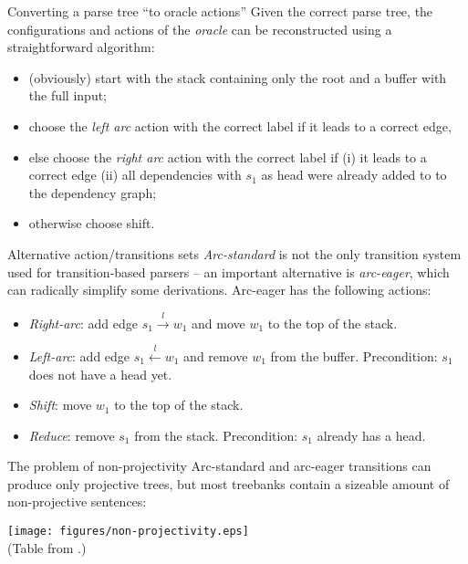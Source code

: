 \documentclass[style=upen, size=14pt]{powerdot}
\newcommand{\gold}{\color{arany}}
\theoremstyle{definition}
\begin{document}
\begin{slide}[toc=Oracle actions]{Converting a parse tree ``to oracle actions''}
  Given the correct parse tree, the configurations and actions of the
  \emph{oracle} can be reconstructed using a straightforward algorithm:
  \begin{itemize}
  \item (obviously) start with the stack containing only the root and a buffer
    with the full input;
  \item choose the \emph{left arc} action with the correct label if it leads to a
    correct edge,
  \item else choose the \emph{right arc} action with the correct label if (i) it
    leads to a correct edge (ii) all dependencies with $s_1$ as head were already
    added to to the dependency graph;
  \item otherwise choose shift.
  \end{itemize}
\end{slide}

\begin{slide}[toc=Other actions]{Alternative action/transitions sets}
  \emph{Arc-standard} is not the only transition system used for
  transition-based parsers -- an important alternative is \emph{\gold
    arc-eager}, which can radically simplify some derivations. Arc-eager has the
  following actions:
  \begin{itemize}
  \item \emph{\gold Right-arc}: add edge $s_1\xrightarrow{l} w_1$ and move $w_1$
    to the top of the stack.
  \item \emph{\gold Left-arc}: add edge $s_1\xleftarrow{l} w_1$ and remove $w_1$
    from the buffer. Precondition: $s_1$ does not have a head yet.
  \item \emph{\gold Shift}: move $w_1$ to the top of the stack.
  \item \emph{\gold Reduce}: remove $s_1$ from the stack. Precondition: $s_1$
    already has a head.
  \end{itemize}
\end{slide}

\begin{slide}[toc=Non-projectivity]{The problem of non-projectivity}
  Arc-standard and arc-eager transitions can produce only projective trees, but
  most treebanks contain a sizeable amount of non-projective sentences:
  \begin{center}
    \texttt{[image: figures/non-projectivity.eps]}\\
    \footnotesize{(Table from \cite{nivre2013beyond}.)}
  \end{center}
\end{slide}
\end{document}
